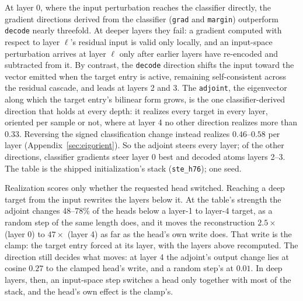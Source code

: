 At layer 0, where the input perturbation reaches the classifier directly,
the gradient directions derived from the classifier (\texttt{grad} and
\texttt{margin}) outperform \texttt{decode} nearly threefold. At deeper
layers they fail: a gradient computed with respect to layer $\ell$'s
residual input is valid only locally, and an input-space perturbation
arrives at layer $\ell$ only after earlier layers have re-encoded and
subtracted from it. By contrast, the \texttt{decode} direction shifts the
input toward the vector emitted when the target entry is active, remaining
self-consistent across the residual cascade, and leads at layers 2 and 3.
The \texttt{adjoint}, the eigenvector along which the target entry's
bilinear form grows, is the one classifier-derived direction that holds at
every depth: it realizes every target in every layer, oriented per sample or
not, where at layer 4 no other direction realizes more than $0.33$.
Reversing the signed classification change instead realizes $0.46$--$0.58$
per layer (Appendix~\ref{sec:eigorient}). So the adjoint steers every layer;
of the other directions, classifier gradients steer layer 0 best and decoded
atoms layers 2--3. The table is the shipped initialization's stack
(\texttt{ste\_h76}); one seed.

Realization scores only whether the requested head switched. Reaching a deep
target from the input rewrites the layers below it. At the table's strength
the adjoint changes 48--78\% of the heads below a layer-1 to layer-4 target,
as a random step of the same length does, and it moves the reconstruction
$2.5\times$ (layer 0) to $47\times$ (layer 4) as far as the head's own write
does. That write is the clamp: the target entry forced at its layer, with the
layers above recomputed. The direction still decides what moves: at layer 4
the adjoint's output change lies at cosine $0.27$ to the clamped head's
write, and a random step's at $0.01$. In deep layers, then, an input-space
step switches a head only together with most of the stack, and the head's own
effect is the clamp's.

